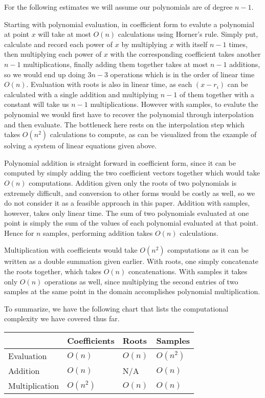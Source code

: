\documentclass[12pt]{article}
\begin{document}
For the following estimates we will assume our polynomials are of degree $n-1$.

Starting with polynomial evaluation, in coefficient form to evalute a polynomial at point $x$ will take at most $O(n)$ calculations using Horner's rule. Simply put, calculate and record each power of $x$ by multiplying $x$ with itself $n-1$ times, then multiplying each power of $x$ with the corresponding coefficient takes another $n-1$ multiplications, finally adding them together takes at most $n-1$ additions, so we would end up doing $3n-3$ operations which is in the order of linear time $O(n)$. Evaluation with roots is also in linear time, as each $(x-r_i)$ can be calculated with a single addition and multiplying $n-1$ of them together with a constant will take us $n-1$ multiplications. However with samples, to evalute the polynomial we would first have to recover the polynomial through interpolation and then evaluate. The bottleneck here rests on the interpolation step which takes $O(n^2)$ calculations to compute, as can be visualized from the example of solving a system of linear equations given above.

Polynomial addition is straight forward in coefficient form, since it can be computed by simply adding the two coefficient vectors together which would take $O(n)$ computations. Addition given only the roots of two polynomials is extremely difficult, and conversion to other forms would be costly as well, so we do not consider it as a feasible approach in this paper. Addition with samples, however, takes only linear time. The sum of two polynomials evaluated at one point is simply the sum of the values of each polynomial evaluated at that point. Hence for $n$ samples, performing addition takes $O(n)$ calculations.

Multiplication with coefficients would take $O(n^2)$ computations as it can be written as a double summation given earlier. With roots, one simply concatenate the roots together, which takes $O(n)$ concatenations. With samples it takes only $O(n)$ operations as well, since multiplying the second entries of two samples at the same point in the domain accomplishes polynomial multiplication.

To summarize, we have the following chart that lists the computational complexity we have covered thus far.


\begin{tabular}{|p{2.8cm}||p{2cm}|p{2cm}|p{2cm}|}
\hline
&Coefficients&Roots&Samples\\
\hline\hline
Evaluation&$O(n)$&$O(n)$&$O(n^2)$\\
\hline
Addition&$O(n)$&N/A&$O(n)$\\
\hline
Multiplication&$O(n^2)$&$O(n)$&$O(n)$\\
\hline
\end{tabular}
\medskip
\end{document}

